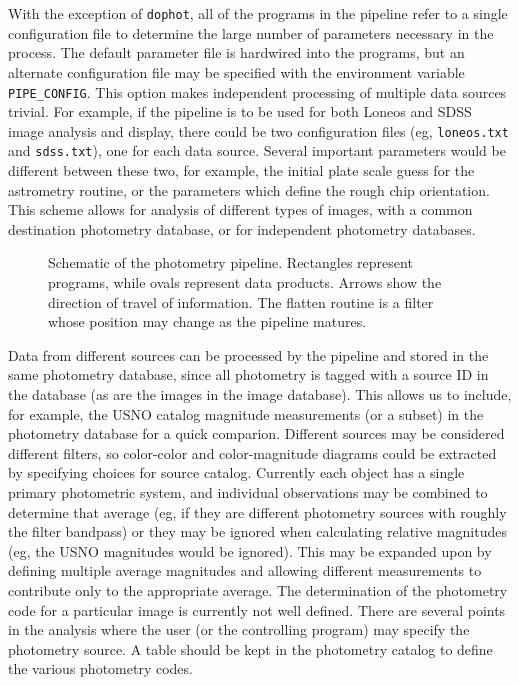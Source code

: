 \documentclass{article}
\begin{document}
With the exception of {\tt dophot}, all of the programs in the
pipeline refer to a single configuration file to determine the large
number of parameters necessary in the process.  The default parameter
file is hardwired into the programs, but an alternate configuration
file may be specified with the environment variable {\tt
  PIPE\_CONFIG}.  This option makes independent processing of multiple
data sources trivial.  For example, if the pipeline is to be used for
both Loneos and SDSS image analysis and display, there could be two
configuration files (eg, {\tt loneos.txt} and {\tt sdss.txt}), one for
each data source.  Several important parameters would be different
between these two, for example, the initial plate scale guess for the
astrometry routine, or the parameters which define the rough chip
orientation.  This scheme allows for analysis of different types of
images, with a common destination photometry database, or for
independent photometry databases.

\begin{figure}
\caption{\label{pipeline} \small
  Schematic of the photometry pipeline.  Rectangles represent
  programs, while ovals represent data products.  Arrows show the
  direction of travel of information.  The flatten routine is a filter
  whose position may change as the pipeline matures.  }
\end{figure}

Data from different sources can be processed by the pipeline and
stored in the same photometry database, since all photometry is tagged
with a source ID in the database (as are the images in the image
database).  This allows us to include, for example, the USNO catalog
magnitude measurements (or a subset) in the photometry database for a
quick comparion.  Different sources may be considered different
filters, so color-color and color-magnitude diagrams could be
extracted by specifying choices for source catalog.  Currently each
object has a single primary photometric system, and individual
observations may be combined to determine that average (eg, if they
are different photometry sources with roughly the filter bandpass) or
they may be ignored when calculating relative magnitudes (eg, the USNO
magnitudes would be ignored).  This may be expanded upon by defining
multiple average magnitudes and allowing different measurements to
contribute only to the appropriate average.  The determination of the
photometry code for a particular image is currently not well defined.
There are several points in the analysis where the user (or the
controlling program) may specify the photometry source.  A table
should be kept in the photometry catalog to define the various
photometry codes.  
\end{document}
